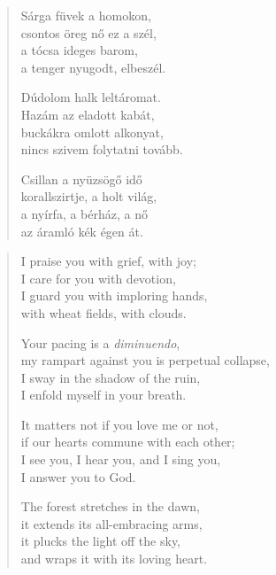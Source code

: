 \documentclass[11pt]{book}
\newcommand*{\centeredornament}{\centerline{\pgfornament[width=6cm]{88}}}
\begin{document}
\newpage

\vspace*{-15mm}
\centeredornament



\begin{verse}
  Sárga füvek a homokon, \\
  csontos öreg nő ez a szél, \\
  a tócsa ideges barom, \\
  a tenger nyugodt, elbeszél.

  Dúdolom halk leltáromat. \\
  Hazám az eladott kabát, \\
  buckákra omlott alkonyat, \\
  nincs szivem folytatni tovább.

  Csillan a nyüzsögő idő \\
  korallszirtje, a holt világ, \\
  a nyírfa, a bérház, a nő \\
  az áramló kék égen át.
\end{verse}

\newpage

\vspace*{-15mm}
\centeredornament



\begin{verse}
  I praise you with grief, with joy; \\
  I care for you with devotion, \\
  I guard you with imploring hands, \\
  with wheat fields, with clouds.

  Your pacing is a \emph{diminuendo}, \\
  my rampart against you is perpetual collapse, \\
  I sway in the shadow of the ruin, \\
  I enfold myself in your breath.

  It matters not if you love me or not, \\
  if our hearts commune with each other;\\
  I see you, I hear you, and I sing you, \\
  I answer you to God.

  The forest stretches in the dawn, \\
  it extends its all-embracing arms, \\
  it plucks the light off the sky, \\
  and wraps it with its loving heart.
\end{verse}
\end{document}
